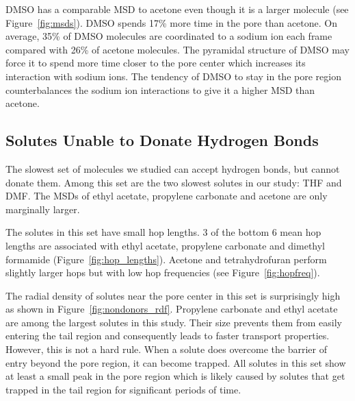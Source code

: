 \documentclass[journal=jpcbfk,manuscript=article]{achemso}
\begin{document}
  DMSO has a comparable MSD to acetone even though it is a larger molecule
  (see Figure~\ref{fig:msds}). DMSO spends 17\% more time in the pore than acetone. 
  On average, 35\% of DMSO molecules are coordinated to a sodium ion each
  frame compared with 26\% of acetone molecules. The pyramidal structure 
  of DMSO may force it to spend more time closer to the pore center which
  increases its interaction with sodium ions. The tendency of DMSO to stay
  in the pore region counterbalances the sodium ion interactions to give it
  a higher MSD than acetone. 
  
  \subsection{Solutes Unable to Donate Hydrogen Bonds}  %

  The slowest set of molecules we studied can accept hydrogen bonds, but
  cannot donate them. Among this set are the two slowest solutes in our study: 
  THF and DMF. The MSDs of ethyl acetate, propylene carbonate and acetone are
  only marginally larger.
  
  The solutes in this set have small hop lengths. 3 of the bottom 6 mean hop
  lengths are associated with ethyl acetate, propylene carbonate and
  dimethyl formamide (Figure~\ref{fig:hop_lengths}). Acetone and 
  tetrahydrofuran perform slightly larger hops but with low hop frequencies
  (see Figure~\ref{fig:hopfreq}).
  
  The radial density of solutes near the pore center in this set is 
  surprisingly high as shown in Figure~\ref{fig:nondonors_rdf}. Propylene
  carbonate and ethyl acetate are among the largest solutes in this study. 
  Their size prevents them from easily entering the tail region and 
  consequently leads to faster transport properties.  %
  However, this is not a hard rule. When a solute does overcome the 
  barrier of entry beyond the pore region, it can become trapped. All
  solutes in this set show at least a small peak in the pore region which
  is likely caused by solutes that get trapped in the tail region for 
  significant periods of time.
    
  
\end{document}
